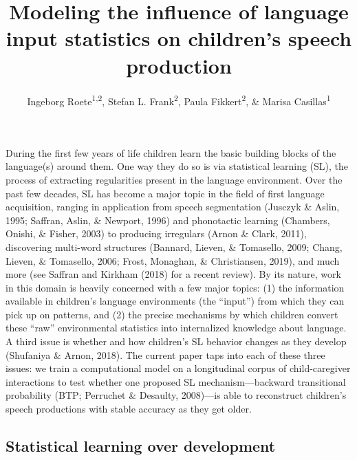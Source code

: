 \documentclass[
  english,
  man,floatsintext]{apa6}
\title{Modeling the influence of language input statistics on children's speech production}
\author{Ingeborg Roete\textsuperscript{1,2}, Stefan L. Frank\textsuperscript{2}, Paula Fikkert\textsuperscript{2}, \& Marisa Casillas\textsuperscript{1}}
\date{}
\affiliation{\vspace{0.5cm}\textsuperscript{1} Max Planck Institute for Psycholinguistics\\\textsuperscript{2} Radboud University}
\begin{document}
\maketitle

During the first few years of life children learn the basic building blocks of the language(s) around them. One way they do so is via statistical learning (SL), the process of extracting regularities present in the language environment. Over the past few decades, SL has become a major topic in the field of first language acquisition, ranging in application from speech segmentation (Jusczyk \& Aslin, 1995; Saffran, Aslin, \& Newport, 1996) and phonotactic learning (Chambers, Onishi, \& Fisher, 2003) to producing irregulars (Arnon \& Clark, 2011), discovering multi-word structures (Bannard, Lieven, \& Tomasello, 2009; Chang, Lieven, \& Tomasello, 2006; Frost, Monaghan, \& Christiansen, 2019), and much more (see Saffran and Kirkham (2018) for a recent review). By its nature, work in this domain is heavily concerned with a few major topics: (1) the information available in children's language environments (the \enquote{input}) from which they can pick up on patterns, and (2) the precise mechanisms by which children convert these \enquote{raw} environmental statistics into internalized knowledge about language. A third issue is whether and how children's SL behavior changes as they develop (Shufaniya \& Arnon, 2018). The current paper taps into each of these three issues: we train a computational model on a longitudinal corpus of child-caregiver interactions to test whether one proposed SL mechanism---backward transitional probability (BTP; Perruchet \& Desaulty, 2008)---is able to reconstruct children's speech productions with stable accuracy as they get older.

\hypertarget{statistical-learning-over-development}{%
\subsection{Statistical learning over development}\label{statistical-learning-over-development}}
\end{document}
